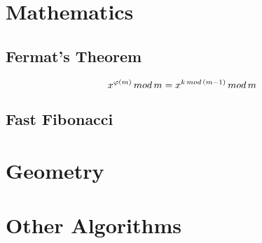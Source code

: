 \documentclass[13pt]{article}
\begin{document}
\section{Mathematics}

\subsection{Fermat's Theorem}\label{sub:fermat_s_theorem} %
\[
	\Huge	x^{\varphi(m)}\,mod\,m = x^{k\,mod\,(m-1)}\,mod\,m
\]


\subsection{Fast Fibonacci}\label{sub:fast_fibonacci} %


\section{Geometry}

\section{Other Algorithms}


\end{document}
